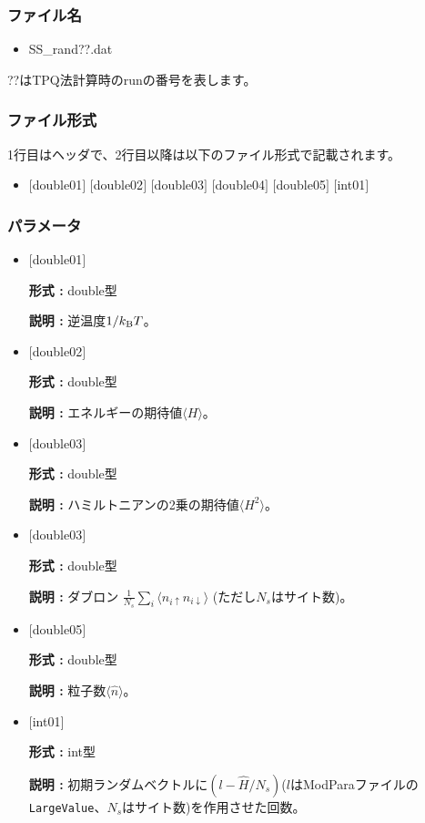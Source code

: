 \subsubsection{ファイル名}
 \begin{itemize}
   \item SS\_rand??.dat
  \end{itemize}
  ??はTPQ法計算時のrunの番号を表します。

\subsubsection{ファイル形式}
1行目はヘッダで、2行目以降は以下のファイル形式で記載されます。
 \begin{itemize}
   \item $[$double01$]$ $[$double02$]$ $[$double03$]$ $[$double04$]$ $[$double05$]$ $[$int01$]$
  \end{itemize}
\subsubsection{パラメータ}
 \begin{itemize}

  \item  $[$double01$]$
  
 {\bf 形式 :} double型

{\bf 説明 :} 逆温度$1/{k_{\rm B}T}$。
 
  \item $[$double02$]$

 {\bf 形式 :} double型 

{\bf 説明 :}  エネルギーの期待値$\langle H \rangle$。

  \item $[$double03$]$

 {\bf 形式 :} double型 

{\bf 説明 :} ハミルトニアンの2乗の期待値$\langle H^2 \rangle$。

  \item $[$double03$]$

 {\bf 形式 :} double型 

{\bf 説明 :} ダブロン
$\frac{1}{N_s} \sum_{i}\langle n_{i\uparrow}n_{i\downarrow}\rangle$ (ただし$N_s$はサイト数)。

  \item $[$double05$]$

 {\bf 形式 :} double型 

{\bf 説明 :} 粒子数$\langle {\hat n} \rangle$。


  \item $[$int01$]$

 {\bf 形式 :} int型 

{\bf 説明 :} 初期ランダムベクトルに$(l-\hat{H}/N_{s})$($l$はModParaファイルの\verb|LargeValue|、$N_{s}$はサイト数)を作用させた回数。

 \end{itemize}

